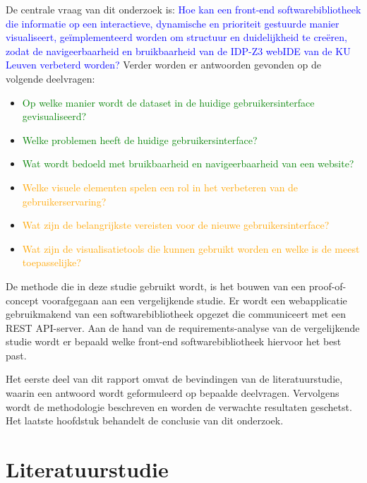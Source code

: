De centrale vraag van dit onderzoek is: \textcolor{blue}{Hoe kan een front-end softwarebibliotheek die informatie op een interactieve, dynamische en prioriteit gestuurde manier visualiseert, geïmplementeerd worden om structuur en duidelijkheid te creëren, zodat de navigeerbaarheid en bruikbaarheid van de IDP-Z3 webIDE van de KU Leuven verbeterd worden?} Verder worden er antwoorden gevonden op de volgende deelvragen:
\begin{itemize}
    \item \textcolor{green}{Op welke manier wordt de dataset in de huidige gebruikersinterface gevisualiseerd?}
    \item \textcolor{green}{Welke problemen heeft de huidige gebruikersinterface?}
    \item \textcolor{green}{Wat wordt bedoeld met bruikbaarheid en navigeerbaarheid van een website?}
    \item \textcolor{orange}{Welke visuele elementen spelen een rol in het verbeteren van de gebruikerservaring?}
    \item \textcolor{orange}{Wat zijn de belangrijkste vereisten voor de nieuwe gebruikersinterface?}
    \item \textcolor{orange}{Wat zijn de visualisatietools die kunnen gebruikt worden en welke is de meest toepasselijke?}
\end{itemize}

De methode die in deze studie gebruikt wordt, is het bouwen van een proof-of-concept voorafgegaan aan een vergelijkende studie. Er wordt een webapplicatie gebruikmakend van een softwarebibliotheek opgezet die communiceert met een REST API-server. Aan de hand van de require\-ments-analyse van de vergelijkende studie wordt er bepaald welke front-end softwarebibliotheek hiervoor het best past.

Het eerste deel van dit rapport omvat de bevindingen van de literatuurstudie, waar\-in een antwoord wordt geformuleerd op bepaalde deelvragen. Vervolgens wordt de methodologie beschreven en worden de verwachte resultaten gesch\-etst. Het laatste hoofdstuk behandelt de conclusie van dit onderzoek.


\section{Literatuurstudie}%
\label{sec:literatuurstudie}

